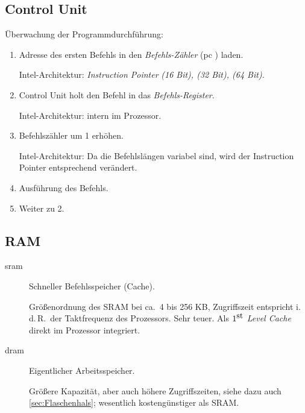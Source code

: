 \subsection{Control Unit}

Überwachung der Programmdurchführung:
\begin{enumerate}
  \item Adresse des ersten Befehls in den \emph{Befehls-Zähler}
	(\gls{pc} ) laden.

	Intel-Architektur: \emph{Instruction Pointer}\emph{  (16 Bit),  (32 Bit),  (64 Bit).}

  \item Control Unit holt den Befehl in das \emph{Befehls-Register}.

	Intel-Architektur: intern im Prozessor.

  \item Befehlszähler um 1 erhöhen.

	Intel-Architektur: Da die Befehlslängen variabel sind, wird der Instruction Pointer entsprechend verändert.

  \item Ausführung des Befehls.
  
  \item Weiter zu 2.
\end{enumerate}

\subsection{RAM}
\begin{description}
  \item [\gls{sram}] 
	Schneller Befehlsspeicher (Cache).

	Größenordnung des SRAM bei ca.~4 bis 256 KB, Zugriffszeit entspricht i.\,d.\,R.~der Taktfrequenz des Prozessors.
	Sehr teuer.
	Als \emph{$1^{\hbox{st}}$ Level Cache} direkt im Prozessor integriert.

  \item [\gls{dram}] 
	Eigentlicher Arbeitsspeicher.

	Größere Kapazität, aber auch höhere Zugriffszeiten, siehe dazu auch \cref{sec:Flaschenhals}; wesentlich kostengünstiger als SRAM.
\end{description}

